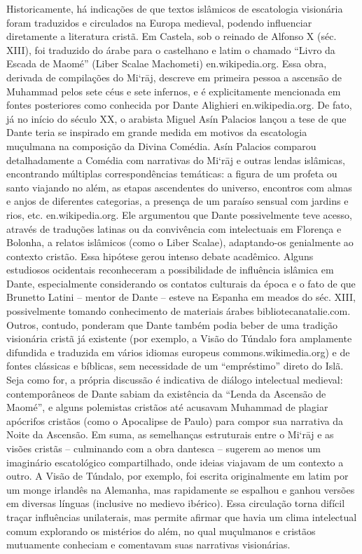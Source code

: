 Historicamente, há indicações de que textos islâmicos de escatologia visionária foram traduzidos e circulados na Europa medieval, podendo influenciar diretamente a literatura cristã. Em Castela, sob o reinado de Alfonso X (séc. XIII), foi traduzido do árabe para o castelhano e latim o chamado “Livro da Escada de Maomé” (Liber Scalae Machometi) en.wikipedia.org. Essa obra, derivada de compilações do Mi‘rāj, descreve em primeira pessoa a ascensão de Muhammad pelos sete céus e sete infernos, e é explicitamente mencionada em fontes posteriores como conhecida por Dante Alighieri en.wikipedia.org. De fato, já no início do século XX, o arabista Miguel Asín Palacios lançou a tese de que Dante teria se inspirado em grande medida em motivos da escatologia muçulmana na composição da Divina Comédia. Asín Palacios comparou detalhadamente a Comédia com narrativas do Mi‘rāj e outras lendas islâmicas, encontrando múltiplas correspondências temáticas: a figura de um profeta ou santo viajando no além, as etapas ascendentes do universo, encontros com almas e anjos de diferentes categorias, a presença de um paraíso sensual com jardins e rios, etc. en.wikipedia.org. Ele argumentou que Dante possivelmente teve acesso, através de traduções latinas ou da convivência com intelectuais em Florença e Bolonha, a relatos islâmicos (como o Liber Scalae), adaptando-os genialmente ao contexto cristão. Essa hipótese gerou intenso debate acadêmico. Alguns estudiosos ocidentais reconheceram a possibilidade de influência islâmica em Dante, especialmente considerando os contatos culturais da época e o fato de que Brunetto Latini -- mentor de Dante -- esteve na Espanha em meados do séc. XIII, possivelmente tomando conhecimento de materiais árabes bibliotecanatalie.com. Outros, contudo, ponderam que Dante também podia beber de uma tradição visionária cristã já existente (por exemplo, a Visão do Túndalo fora amplamente difundida e traduzida em vários idiomas europeus commons.wikimedia.org) e de fontes clássicas e bíblicas, sem necessidade de um “empréstimo” direto do Islã. Seja como for, a própria discussão é indicativa de diálogo intelectual medieval: contemporâneos de Dante sabiam da existência da “Lenda da Ascensão de Maomé”, e alguns polemistas cristãos até acusavam Muhammad de plagiar apócrifos cristãos (como o Apocalipse de Paulo) para compor sua narrativa da Noite da Ascensão. Em suma, as semelhanças estruturais entre o Mi‘rāj e as visões cristãs -- culminando com a obra dantesca -- sugerem ao menos um imaginário escatológico compartilhado, onde ideias viajavam de um contexto a outro. A Visão de Túndalo, por exemplo, foi escrita originalmente em latim por um monge irlandês na Alemanha, mas rapidamente se espalhou e ganhou versões em diversas línguas (inclusive no medievo ibérico). Essa circulação torna difícil traçar influências unilaterais, mas permite afirmar que havia um clima intelectual comum explorando os mistérios do além, no qual muçulmanos e cristãos mutuamente conheciam e comentavam suas narrativas visionárias.

